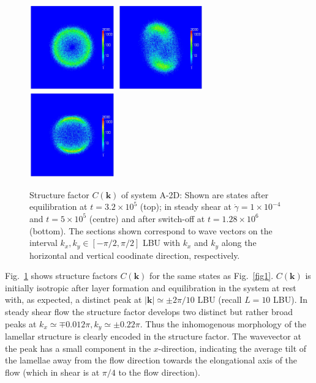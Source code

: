 \documentclass[8.5pt,twoside,twocolumn]{article}
\newcommand{\e}[1]{\times10^{#1}}
\begin{document}
\begin{figure}[htp]
\centering
\includegraphics[angle=0,width=0.33\textwidth]{ck_run703_320.jpg}
\includegraphics[angle=0,width=0.33\textwidth]{ck_run704_500.jpg}
\includegraphics[angle=0,width=0.33\textwidth]{ck_run705_1280.jpg}
\caption{Structure factor $C({\bm k})$ of system A-2D: Shown are states after equilibration at $t=3.2\e{5}$ (top); in steady shear at $\dot{\gamma}=1\times10^{-4}$ and $t=5\e{5}$ (centre) and after switch-off at $t=1.28\e{6}$ (bottom). The sections shown correspond to wave vectors on the interval $k_x, k_y \in [-\pi/2,\pi/2 ]$ LBU with $k_x$ and $k_y$ along the horizontal and vertical coodinate direction, respectively.}
\label{fig5}
\end{figure}

Fig.~\ref{fig5} shows structure factors $C({\bm k})$ for the same states as Fig.~\ref{fig1}.
$C({\bm k})$ is initially isotropic after layer formation and equilibration in the system at rest with, as expected, a distinct peak at $|{\bm k}|\simeq \pm2\pi/10$ LBU (recall $L = 10$ LBU).
In steady shear flow the structure factor develops two distinct but rather broad peaks at $k_x\simeq\mp 0.012\pi, k_y\simeq\pm 0.22 \pi$.
Thus the inhomogenous morphology of the lamellar structure is clearly encoded in the structure factor. 
The wavevector at the peak has a small component in the $x$-direction, indicating the average tilt of the lamellae away from the flow direction towards the elongational axis of the flow (which in shear is at $\pi/4$ to the flow direction). 
\end{document}
